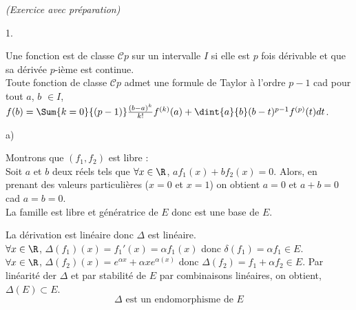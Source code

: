 \documentclass[11pt]{article}%
\begin{document}
 \begin{exercice}{\it (Exercice avec préparation)}~
 \begin{noliste}{1.}
 \setlength{\itemsep}{4mm}
 \item Une fonction est de classe $\mathcal{C}{p}$ sur un intervalle
$I$ si elle est $p$ fois dérivable et que sa dérivée $p$-ième est
continue. \\
 Toute fonction de classe $\mathcal{C}{p}$ admet une formule de Taylor
à l'ordre $p-1$ cad pour tout $a$, $b$ $\in I$, $f(b) = \Sum{k =
0}{(p-1)} \frac{(b-a)^{k}}{k!} f^{(k)}(a) + \dint{a}{b} (b-t)^{p-1}
f^{(p)}(t)dt$.
 \item 
 \begin{noliste}{a)}
 \setlength{\itemsep}{2mm}
 \item Montrons que $(f_{1},f_{2})$ est libre : \\
 Soit $a$ et $b$ deux réels tels que $\forall x \in \R$, $a f_{1}(x) +
b f_{2}(x) = 0$. Alors, en prenant des valeurs particulières ($x = 0$
et $x = 1$) on obtient $a = 0$ et $a + b = 0$ cad $a = b = 0$. \\
 La famille est libre et génératrice de $E$ donc est une base de $E$.
 \item La dérivation est linéaire donc $\Delta$ est linéaire.\\
 $\forall x \in \R$, $\Delta(f_{1})(x) = f_{1}'(x) = \alpha f_{1}(x)$
donc $\delta(f_{1}) = \alpha f_{1} \in E$.\\
 $\forall x \in \R$, $\Delta(f_{2})(x) = e^{\alpha x} + \alpha x
e^{\alpha(x)}$ donc $\Delta(f_{2}) = f_{1} + \alpha f_{2} \in E$. Par
linéarité der $\Delta$ et par stabilité de $E$ par combinaisons
linéaires, on obtient, $\Delta(E) \subset E$. \\
 
\[
 \boxed{\text{$\Delta$ est un endomorphisme de $E$}}
\]

 

\end{noliste}
\end{noliste}
\end{exercice}
\end{document}
